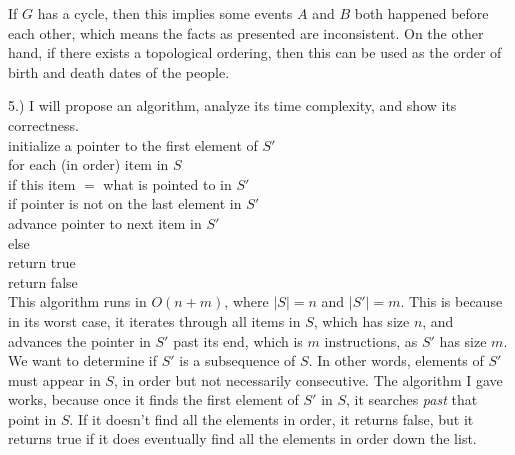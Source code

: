 \documentclass[12pt]{article}
\begin{document}
If $G$ has a cycle, then this implies some events $A$ and $B$ both happened before each other, which means the facts as presented are inconsistent. On the other hand, if there exists a topological ordering, then this can be used as the order of birth and death dates of the people.

\pagebreak

5.) I will propose an algorithm, analyze its time complexity, and show its correctness.\\

initialize a pointer to the first element of $S'$\\
for each (in order) item in $S$\\
\hspace*{5mm} if this item $=$ what is pointed to in $S'$\\
\hspace*{10mm} if pointer is not on the last element in $S'$\\
\hspace*{15mm} advance pointer to next item in $S'$\\
\hspace*{10mm} else\\
\hspace*{15mm} return true\\
return false\\

This algorithm runs in $O(n + m)$, where $|S| = n$ and $|S'| = m$. This is because in its worst case, it iterates through all items in $S$, which has size $n$, and advances the pointer in $S'$ past its end, which is $m$ instructions, as $S'$ has size $m$.\\

We want to determine if $S'$ is a subsequence of $S$. In other words, elements of $S'$ must appear in $S$, in order but not necessarily consecutive. The algorithm I gave works, because once it finds the first element of $S'$ in $S$, it searches \emph{past} that point in $S$. If it doesn't find all the elements in order, it returns false, but it returns true if it does eventually find all the elements in order down the list.
\end{document}
